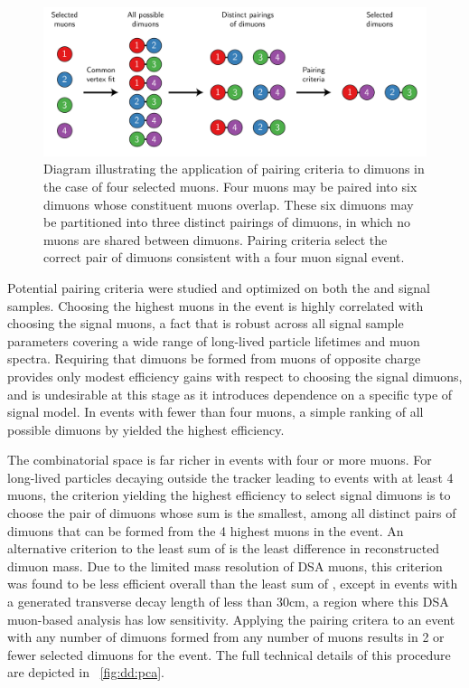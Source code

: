 \begin{figure}[htpb]
  \centering
  \includegraphics[width=\textwidth]{figures/displaced/PairingCriteriaDiagram.pdf}
  \caption[Diagram illustrating the application of pairing criteria to dimuons in the case of four selected muons.]{Diagram illustrating the application of pairing criteria to dimuons in the case of four selected muons. Four muons may be paired into six dimuons whose constituent muons overlap. These six dimuons may be partitioned into three distinct pairings of dimuons, in which no muons are shared between dimuons. Pairing criteria select the correct pair of dimuons consistent with a four muon signal event.}
  \label{fig:dd:pc}
\end{figure}

Potential pairing criteria were studied and optimized on both the \twoMu and \fourMu signal samples.
Choosing the highest \pT muons in the event is highly correlated with choosing the signal muons, a fact that is robust across all signal sample parameters covering a wide range of long-lived particle lifetimes and muon \pT spectra.
Requiring that dimuons be formed from muons of opposite charge provides only modest efficiency gains with respect to choosing the signal dimuons, and is undesirable at this stage as it introduces dependence on a specific type of signal model.
In events with fewer than four muons, a simple ranking of all possible dimuons by \vchisq yielded the highest efficiency.

The combinatorial space is far richer in events with four or more muons.
For long-lived particles decaying outside the tracker leading to events with at least 4 muons, the criterion yielding the highest efficiency to select signal dimuons is to choose the pair of dimuons whose \vchisq sum is the smallest, among all distinct pairs of dimuons that can be formed from the 4 highest \pT muons in the event. 
An alternative criterion to the least sum of \vchisq is the least difference in reconstructed dimuon mass.
Due to the limited mass resolution of DSA muons, this criterion was found to be less efficient overall than the least sum of \vchisq, except in events with a generated transverse decay length of less than 30\unit{cm}, a region where this DSA muon-based analysis has low sensitivity.
Applying the pairing critera to an event with any number of dimuons formed from any number of muons results in 2 or fewer selected dimuons for the event.
The full technical details of this procedure are depicted in \Fig~\ref{fig:dd:pca}.

